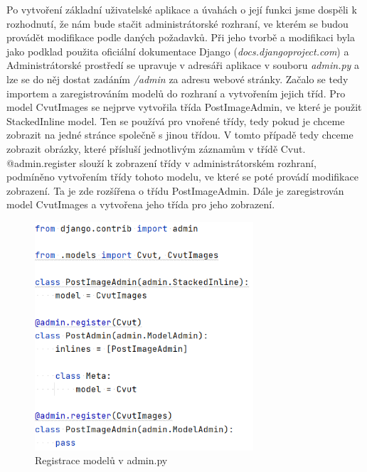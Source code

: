 Po vytvoření základní uživatelské aplikace a úvahách o její funkci jsme dospěli k rozhodnutí, že nám bude stačit administrátorské rozhraní, ve kterém se budou provádět modifikace podle daných požadavků.
Při jeho tvorbě a modifikaci byla jako podklad použita oficiální dokumentace Django (\emph{docs.djangoproject.com}) a \cite{django-admin-book} Administrátorské prostředí se upravuje v adresáři aplikace v souboru \emph{admin.py} a lze se do něj dostat zadáním \emph{/admin} za  adresu webové stránky. Začalo se tedy importem a zaregistrováním modelů do rozhraní a vytvořením jejich tříd. Pro model CvutImages se nejprve vytvořila třída PostImageAdmin, ve které je použit StackedInline model. Ten se používá pro vnořené třídy, tedy pokud je chceme zobrazit na jedné stránce společně s jinou třídou. V tomto případě tedy chceme zobrazit obrázky, které přísluší jednotlivým záznamům v třídě Cvut. @admin.register slouží k zobrazení třídy v administrátorském rozhraní, podmíněno vytvořením třídy tohoto modelu, ve které se poté provádí modifikace zobrazení. Ta je zde rozšířena o třídu PostImageAdmin. Dále je zaregistrován model CvutImages a vytvořena jeho třída pro jeho zobrazení.

\begin{figure}[H] \centering
    \includegraphics[width=230pt]{./pictures/12-admin-reg.PNG}
    \caption[Registrace modelů v admin.py]{Registrace modelů v admin.py}
	\label{fig:Registrace modelů v admin.py}              
\end{figure}

\newpage

